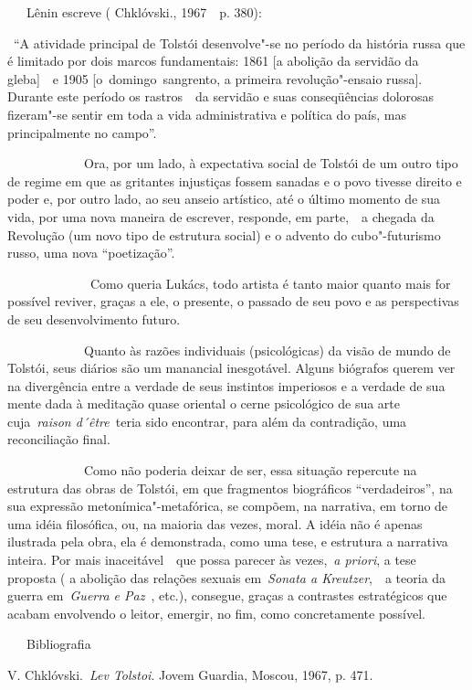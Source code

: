 ~~~Lênin escreve ( Chklóvski., 1967~~p. 380):

~``A atividade principal de Tolstói desenvolve"-se no período da história
russa que é limitado por dois marcos fundamentais: 1861 {[}a abolição da
servidão da gleba{]}~~e 1905 {[}o~domingo~sangrento, a primeira
revolução"-ensaio russa{]}. Durante este período os rastros~~da servidão
e suas conseqüências dolorosas fizeram"-se sentir em toda a vida
administrativa e política do país, mas principalmente no campo''.

~~~~~~~~~~~~Ora, por um lado, à expectativa social de Tolstói de um
outro tipo de regime em que as gritantes injustiças fossem sanadas e o
povo tivesse direito e poder e, por outro lado, ao seu anseio artístico,
até o último momento de sua vida, por uma nova maneira de escrever,
responde, em parte,~~a chegada da Revolução (um novo tipo de estrutura
social) e o advento do cubo"-futurismo russo, uma nova ``poetização''.

~~~~~~~~~~~~~Como queria Lukács, todo artista é tanto maior quanto mais
for possível reviver, graças a ele, o presente, o passado de seu povo e
as perspectivas de seu desenvolvimento futuro.

~~~~~~~~~~~~Quanto às razões individuais (psicológicas) da visão de
mundo de Tolstói, seus diários são um manancial inesgotável. Alguns
biógrafos querem ver na divergência entre a verdade de seus instintos
imperiosos e a verdade de sua mente dada à meditação quase oriental o
cerne psicológico de sua arte cuja~\emph{{raison d´être}}~teria sido
encontrar, para além da contradição, uma reconciliação final.

~~~~~~~~~~~~Como não poderia deixar de ser, essa situação repercute na
estrutura das obras de Tolstói, em que fragmentos biográficos
``verdadeiros'', na sua expressão metonímica"-metafórica, se compõem, na
narrativa, em torno de uma idéia filosófica, ou, na maioria das vezes,
moral. A idéia não é apenas ilustrada pela obra, ela é demonstrada, como
uma tese, e estrutura a narrativa inteira. Por mais inaceitável~~que
possa parecer às vezes,~\emph{a priori}, a tese proposta ( a abolição
das relações sexuais em~\emph{Sonata a Kreutzer},~~a teoria da guerra
em~\emph{Guerra e Paz}~, etc.), consegue, graças a contrastes
estratégicos que acabam envolvendo o leitor, emergir, no fim, como
concretamente possível.

~~~Bibliografia

V. Chklóvski.~\emph{Lev Tolstoi}. Jovem Guardia, Moscou, 1967, p. 471.

